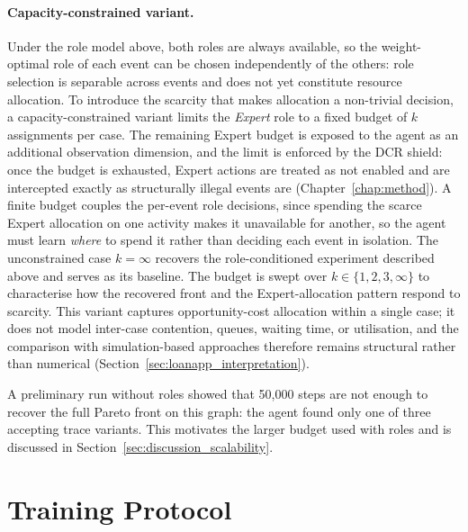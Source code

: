 \paragraph{Capacity-constrained variant.}
Under the role model above, both roles are always available, so the
weight-optimal role of each event can be chosen independently of the
others: role selection is separable across events and does not yet
constitute resource allocation. To introduce the scarcity that makes
allocation a non-trivial decision, a capacity-constrained variant
limits the \emph{Expert} role to a fixed budget of $k$ assignments per
case. The remaining Expert budget is exposed to the agent as an
additional observation dimension, and the limit is enforced by the
\ac{DCR} shield: once the budget is exhausted, Expert actions are
treated as not enabled and are intercepted exactly as structurally
illegal events are (Chapter~\ref{chap:method}). A finite budget couples
the per-event role decisions, since spending the scarce Expert
allocation on one activity makes it unavailable for another, so the
agent must learn \emph{where} to spend it rather than deciding each
event in isolation. The unconstrained case $k=\infty$ recovers the
role-conditioned experiment described above and serves as its baseline.
The budget is swept over $k \in \{1, 2, 3, \infty\}$
to characterise how the recovered front and the Expert-allocation
pattern respond to scarcity. This variant captures opportunity-cost
allocation within a single case; it does not model inter-case
contention, queues, waiting time, or utilisation, and the comparison
with simulation-based approaches therefore remains structural rather
than numerical (Section~\ref{sec:loanapp_interpretation}).

\begin{remark}
A preliminary run without roles showed that 50{,}000 steps are not
enough to recover the full Pareto front on this graph: the agent found
only one of three accepting trace variants. This motivates the larger
budget used with roles and is discussed in
Section~\ref{sec:discussion_scalability}.
\end{remark}

\section{Training Protocol}
\label{sec:training_protocol}

